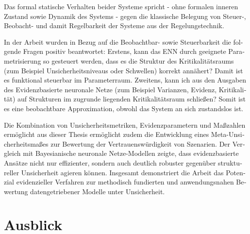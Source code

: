 \begin{otherlanguage}{ngerman}
Das formal statische Verhalten beider Systeme spricht - ohne formalen inneren Zustand sowie Dynamik des Systems - gegen die klassische Belegung von Steuer-, Beobacht- und damit Regelbarkeit der Systeme aus der Regelungstechnik.

In der Arbeit wurden in Bezug auf die Beobachtbar- sowie Steuerbarkeit die folgende Fragen positiv beantwortet: Erstens, kann das ENN durch geeignete Parametrisierung so gesteuert werden, dass es die Struktur des Kritikalitätsraums (zum Beispiel Unsicherheitsniveaus oder Schwellen) korrekt annähert? Damit ist es funktional steuerbar im Parameterraum. Zweitens, kann ich aus den Ausgaben des \gls{Evidenzbasierte neuronale Netze} (zum Beispiel Varianzen, Evidenz, Kritikalität) auf Strukturen im zugrunde liegenden Kritikalitätsraum schließen? Somit ist es eine beobachtbare Approximation, obwohl das System an sich zustandslos ist.

Die Kombination von Unsicherheitsmetriken, Evidenzparametern und Maßzahlen ermöglicht aus dieser Thesis ermöglicht zudem die Entwicklung eines Meta-Unsicherheitsmaßes zur Bewertung der Vertrauenswürdigkeit von Szenarien. Der Vergleich mit \gls{Bayesianische neuronale Netze}-Modellen zeigte, dass evidenzbasierte Ansätze nicht nur effizienter, sondern auch deutlich robuster gegenüber struktureller Unsicherheit agieren können. Insgesamt demonstriert die Arbeit das Potenzial evidenzieller Verfahren zur methodisch fundierten und anwendungsnahen Bewertung datengetriebener Modelle unter Unsicherheit.



\section{Ausblick}


\end{otherlanguage}
